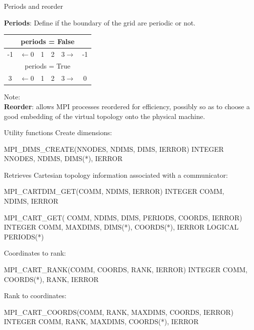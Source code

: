 \documentclass[aspectratio=43]{beamer}
\begin{document}
\begin{frame}[fragile]{Periods and reorder}

\textbf{Periods}: Define if the boundary of the grid are periodic or not.\\
\begin{center}
\begin{tabular}{cccccc}
    \multicolumn{6}{c}{periods = False} \\\hline
    \color{cscsred}-1 & $\leftarrow$\color{cscsblue}0 &\color{cscsblue}1 & \color{cscsblue}2 & {\color{cscsblue}3}$\rightarrow$ & \color{cscsred}-1\\\hline
    \multicolumn{6}{c}{periods = True} \\\hline
    \color{cscsred}3 & $\leftarrow$\color{cscsblue}0 & \color{cscsblue}1 & \color{cscsblue}2 & {\color{cscsblue}3}$\rightarrow$ & \color{cscsred}0\\\hline
\end{tabular}
\end{center}
Note: \\

\textbf{Reorder}: allows MPI processes reordered for efficiency, possibly so as to choose a good embedding of the virtual topology onto the physical machine.

\end{frame}

\begin{frame}[fragile]{Utility functions}
Create dimensions:
\begin{Fortranlisting}[]{}
MPI_DIMS_CREATE(NNODES, NDIMS, DIMS, IERROR)
INTEGER NNODES, NDIMS, DIMS(*), IERROR
\end{Fortranlisting}
Retrieves Cartesian topology information associated with a communicator:
\begin{Fortranlisting}[]{}
MPI_CARTDIM_GET(COMM, NDIMS, IERROR)
INTEGER COMM, NDIMS, IERROR

MPI_CART_GET( COMM, NDIMS, DIMS, PERIODS, COORDS, IERROR)
INTEGER COMM, MAXDIMS, DIMS(*), COORDS(*), IERROR
LOGICAL PERIODS(*)
\end{Fortranlisting}
Coordinates to rank:
\begin{Fortranlisting}[]{}
MPI_CART_RANK(COMM, COORDS, RANK, IERROR)
INTEGER COMM, COORDS(*), RANK, IERROR
\end{Fortranlisting}
Rank to coordinates:
\begin{Fortranlisting}[]{}
MPI_CART_COORDS(COMM, RANK, MAXDIMS, COORDS, IERROR)
INTEGER COMM, RANK, MAXDIMS, COORDS(*), IERROR
\end{Fortranlisting}
\end{frame}
\end{document}
